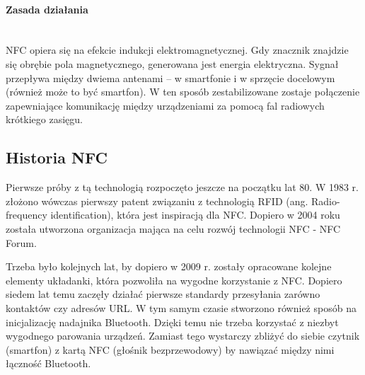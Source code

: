 \documentclass{article}
\numberwithin{equation}{section}
\begin{document}
\paragraph{Zasada działania}\mbox{}\\
NFC opiera się na efekcie indukcji elektromagnetycznej. Gdy znacznik znajdzie się obrębie pola magnetycznego, generowana jest energia elektryczna. Sygnał przepływa między dwiema antenami – w smartfonie i w sprzęcie docelowym (również może to być smartfon). W ten sposób zestabilizowane zostaje połączenie zapewniające komunikację między urządzeniami za pomocą fal radiowych krótkiego zasięgu.
\subsection{Historia NFC}
Pierwsze próby z tą technologią rozpoczęto jeszcze na początku lat 80. W 1983 r. złożono wówczas pierwszy patent związaniu z technologią RFID (ang. Radio-frequency identification), która jest inspiracją dla NFC. Dopiero w 2004 roku została utworzona organizacja mająca na celu rozwój technologii NFC - NFC Forum.
\par
Trzeba było kolejnych lat, by dopiero w 2009 r. zostały opracowane kolejne elementy układanki, która pozwoliła na wygodne korzystanie z NFC. Dopiero siedem lat temu zaczęły działać pierwsze standardy przesyłania zarówno kontaktów czy adresów URL. W tym samym czasie stworzono również sposób na inicjalizację nadajnika Bluetooth. Dzięki temu nie trzeba korzystać z niezbyt wygodnego parowania urządzeń. Zamiast tego wystarczy zbliżyć do siebie czytnik (smartfon) z kartą NFC (głośnik bezprzewodowy) by nawiązać między nimi łączność Bluetooth.
\end{document}
